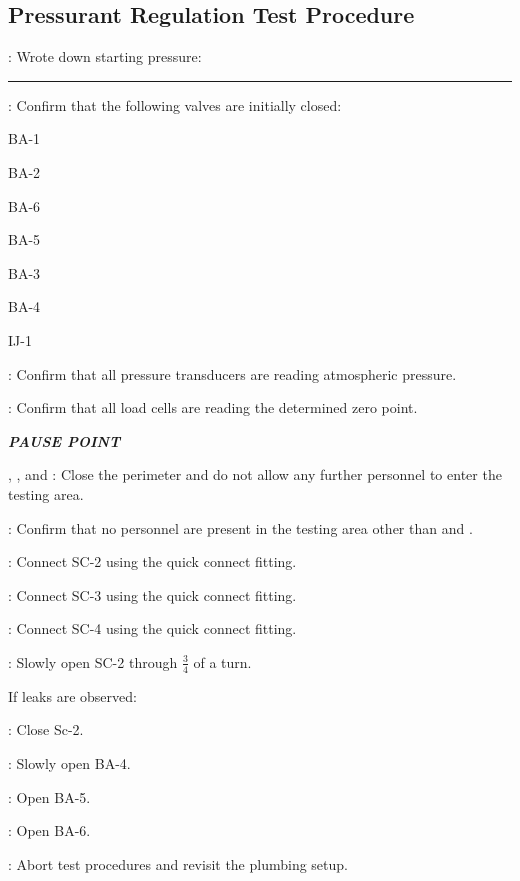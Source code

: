 \subsection{Pressurant Regulation Test Procedure}
\begin{checklist}
    \item \ops{}: Wrote down starting pressure: \rule{10em}{0.4pt}
    \item \primary{}: Confirm that the following valves are initially closed:
    \begin{checklist}
		\item BA-1
        \item BA-2
        \item BA-6
        \item BA-5
		\item BA-3
		\item BA-4
		\item IJ-1
    \end{checklist}
    \item \daq{}: Confirm that all pressure transducers are reading atmospheric pressure.
    \item \daq{}: Confirm that all load cells are reading the determined zero point.
    \item \textbf{\textit{PAUSE POINT}}
    \item \peri{}, \perii{}, and \periii{}: Close the perimeter and do not allow any further personnel to enter the testing area.
    \item \secondary: Confirm that no personnel are present in the testing area other than \primary{} and \secondary.
    \item \primary{}: Connect SC-2 using the quick connect fitting.
    \item \primary{}: Connect SC-3 using the quick connect fitting.
    \item \primary{}: Connect SC-4 using the quick connect fitting.
     \item \primary{}: Slowly open SC-2 through $\frac{3}{4}$ of a turn.
    \item If leaks are observed:
    \begin{checklist}
            \item \primary{}: Close Sc-2. 
            \item \primary{}: Slowly open BA-4.
            \item \primary{}: Open BA-5. 
            \item \primary{}: Open BA-6. 
            \item \ops{}: Abort test procedures and revisit the plumbing setup. 

\end{checklist}
\end{checklist}
